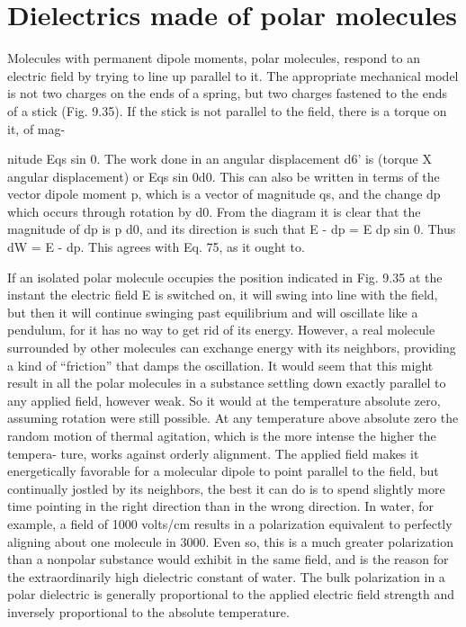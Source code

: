 {{\section{Dielectrics made of polar molecules}

Molecules with permanent dipole moments, polar molecules,
respond to an electric field by trying to line up parallel to it. The
appropriate mechanical model is not two charges on the ends of a
spring, but two charges fastened to the ends of a stick (Fig. 9.35).
If the stick is not parallel to the field, there is a torque on it, of mag-

nitude Eqs sin 0. The work done in an angular displacement d6' is
(torque X angular displacement) or Eqs sin 0d0. This can also
be written in terms of the vector dipole moment p, which is a vector
of magnitude qs, and the change dp which occurs through rotation
by d0. From the diagram it is clear that the magnitude of dp is p d0,
and its direction is such that E - dp = E dp sin 0. Thus dW = E - dp.
This agrees with Eq. 75, as it ought to.

If an isolated polar molecule occupies the position indicated in
Fig. 9.35 at the instant the electric field E is switched on, it will swing
into line with the field, but then it will continue swinging past equilibrium
and will oscillate like a pendulum, for it has no way to get
rid of its energy. However, a real molecule surrounded by other
molecules can exchange energy with its neighbors, providing a kind
of ``friction'' that damps the oscillation. It would seem that this
might result in all the polar molecules in a substance settling down
exactly parallel to any applied field, however weak. So it would at
the temperature absolute zero, assuming rotation were still possible.
At any temperature above absolute zero the random motion of
thermal agitation, which is the more intense the higher the tempera-
ture, works against orderly alignment. The applied field makes it
energetically favorable for a molecular dipole to point parallel to
the field, but continually jostled by its neighbors, the best it can do
is to spend slightly more time pointing in the right direction than in
the wrong direction. In water, for example, a field of 1000 volts/cm
results in a polarization equivalent to perfectly aligning about one
molecule in 3000. Even so, this is a much greater polarization than
a nonpolar substance would exhibit in the same field, and is the
reason for the extraordinarily high dielectric constant of water. The
bulk polarization in a polar dielectric is generally proportional to
the applied electric field strength and inversely proportional to the
absolute temperature.

}}
